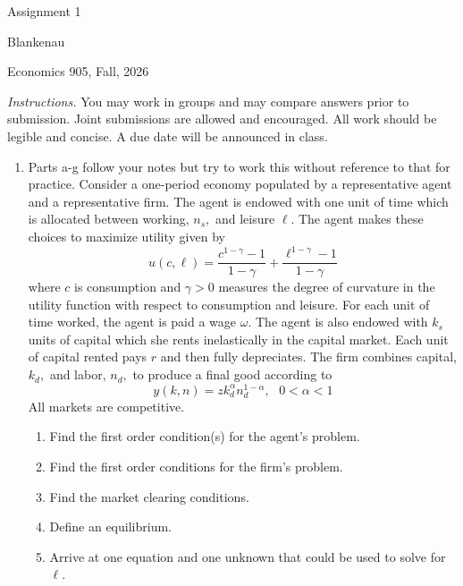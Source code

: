 \documentclass[11pt]{article}
\begin{document}
\begin{center}
{\LARGE Assignment 1}
\end{center}

\noindent Blankenau

\noindent Economics 905, Fall, 2026

\medskip
\noindent \textit{Instructions.} You may work in groups and may compare
answers prior to submission. Joint submissions are allowed and encouraged.
All work should be legible and concise. A due date will be announced in
class.

\begin{enumerate}
\item Parts a-g follow your notes but try to work this without reference to
that for practice. Consider a one-period economy populated by a
representative agent and a representative firm. The agent is endowed with
one unit of time which is allocated between working, $n_{s},$ and leisure $%
\ell $. The agent makes these choices to maximize utility given by 
\begin{equation*}
u\left( c,\ell \right) =\frac{c^{1-\gamma }-1}{1-\gamma }+\frac{\ell
^{1-\gamma }-1}{1-\gamma }
\end{equation*}%
where $c$ is consumption and $\gamma >0$ measures the degree of curvature in
the utility function with respect to consumption and leisure. For each unit
of time worked, the agent is paid a wage $\omega $. The agent is also
endowed with $k_{s}$ units of capital which she rents inelastically in the
capital market. Each unit of capital rented pays $r$ and then fully
depreciates. The firm combines capital, $k_{d},$ and labor, $n_{d},$ to
produce a final good according to 
\begin{equation}
y\left( k,n\right) =zk_{d}^{\alpha }n_{d}^{1-\alpha },\text{ }0<\alpha <1
\label{out}
\end{equation}%
All markets are competitive.

\begin{enumerate}
\item Find the first order condition(s) for the agent's problem.

\item Find the first order conditions for the firm's problem.

\item Find the market clearing conditions.

\item Define an equilibrium.

\item Arrive at one equation and one unknown that could be used to solve for 
$\ell .$


\end{enumerate}
\end{enumerate}
\end{document}
